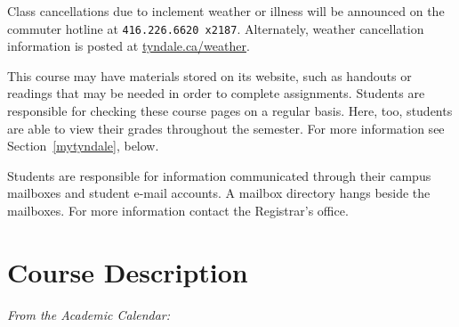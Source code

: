 \begin{titlepage}
\begin{center}
    \begin{description}\small
      \item[Commuter Hotline]
        Class cancellations due to inclement weather or illness will
        be announced on the commuter hotline at \texttt{416.226.6620
        x2187}. Alternately, weather cancellation information is posted
        at \href{http://tyndale.ca/weather}{tyndale.ca/weather}.
      \item[MyTyndale.ca]
        This course may have materials stored on its website, such as
        handouts or readings that may be needed in order to complete
        assignments. Students are responsible for checking these course
        pages on a regular basis. Here, too, students are able to view
        their grades throughout the semester. For more information see
        Section~\ref{mytyndale}, below.
      \item[Mail]
        Students are responsible for information communicated through
        their campus mailboxes and student e-mail accounts. A mailbox
        directory hangs beside the mailboxes. For more information
        contact the Registrar's office.
    \end{description}

  \end{center}

  \section{Course Description}
  \label{description}

  \emph{From the Academic Calendar:} \cdescrip

\end{titlepage}
\setcounter{page}{2} %
